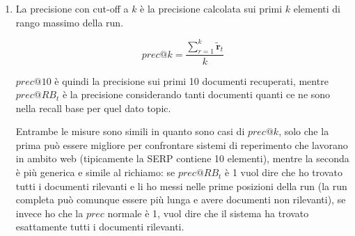 \begin{enumerate}
	\item La precisione con cut-off a $k$ è la precisione calcolata sui primi $k$ elementi di rango massimo della run.
	
	$$
	prec@k = \frac{\sum\limits_{r = 1}^{k} \tilde{\mathbf{r}}_t}{k}
	$$
	
	$prec@10$ è quindi la precisione sui primi 10 documenti recuperati, mentre $prec@RB_t$ è la precisione considerando tanti documenti quanti ce ne sono nella recall base per quel dato topic.
	
	Entrambe le misure sono simili in quanto sono casi di $prec@k$, solo che la prima può essere migliore per confrontare sistemi di reperimento che lavorano in ambito web (tipicamente la SERP contiene 10 elementi), mentre la seconda è più generica e simile al richiamo: se $prec@RB_t$ è 1 vuol dire che ho trovato tutti i documenti rilevanti e li ho messi nelle prime posizioni della run (la run completa può comunque essere più lunga e avere documenti non rilevanti), se invece ho che la $prec$ normale è 1, vuol dire che il sistema ha trovato esattamente tutti i documenti rilevanti. 
	
\end{enumerate}
